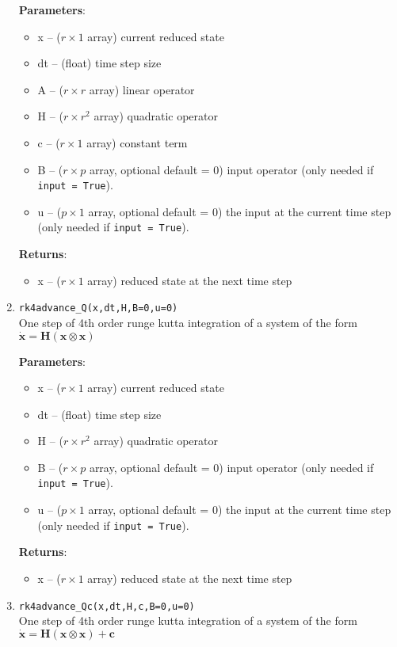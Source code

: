 \documentclass[11pt]{article} %
\newcommand{\code}[1]{\colorbox{light-gray}{\texttt{#1}}}
\newcommand{\bx}{\mathbf{x}}
\newcommand{\bc}{\mathbf{c}}
\newcommand{\bH}{\mathbf{H}}
\begin{document}
\begin{enumerate}
\textbf{Parameters}:
	\begin{itemize}
	\item[] x -- ($r\times 1$ array) current reduced state 
	\item[] dt -- (float) time step size
	\item[] A -- ($r \times r$ array) linear operator
	\item[] H -- ($r \times r^2$ array) quadratic operator
	\item[] c -- ($r \times 1$ array) constant term
	\item[] B -- ($r \times p$ array, optional default = 0) input operator (only needed if \code{input = True}).
	\item[] u -- ($p \times 1$ array, optional default = 0) the input at the current time step (only needed if \code{input = True}).
	\end{itemize}
\textbf{Returns}:
\begin{itemize}
\item[] x -- ($r \times 1$ array) reduced state at the next time step
\end{itemize}

\item{\code{rk4advance\_Q(x,dt,H,B=0,u=0)}}\\
One step of 4th order runge kutta integration of a system of the form $\dot{\bx} = \bH (\bx \otimes \bx) $

\textbf{Parameters}:
	\begin{itemize}
	\item[] x -- ($r\times 1$ array) current reduced state 
	\item[] dt -- (float) time step size
	\item[] H -- ($r \times r^2$ array) quadratic operator
	\item[] B -- ($r \times p$ array, optional default = 0) input operator (only needed if \code{input = True}).
	\item[] u -- ($p \times 1$ array, optional default = 0) the input at the current time step (only needed if \code{input = True}).
	\end{itemize}
\textbf{Returns}:
\begin{itemize}
\item[] x -- ($r \times 1$ array) reduced state at the next time step
\end{itemize}

\item{\code{rk4advance\_Qc(x,dt,H,c,B=0,u=0)}}\\
One step of 4th order runge kutta integration of a system of the form $\dot{\bx} = \bH (\bx \otimes \bx) + \bc$


\end{enumerate}
\end{document}
